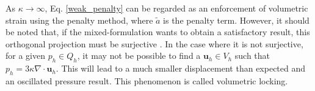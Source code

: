 As $\kappa \rightarrow \infty$, Eq. \eqref{weak_penalty} can be regarded as an enforcement of volumetric strain using the penalty method, where $\tilde{a}$ is the penalty term. However, it should be noted that, if the mixed-formulation wants to obtain a satisfactory result, this orthogonal projection must be surjective \cite{stein2004}. In the case where it is not surjective, for a given $p_h \in Q_h$, it may not be possible to find a $\boldsymbol{u}_h \in V_h$ such that $p_h = 3\kappa \nabla \cdot \boldsymbol{u}_h$. This will lead to a much smaller displacement than expected and an oscillated pressure result. This phenomenon is called volumetric locking.
